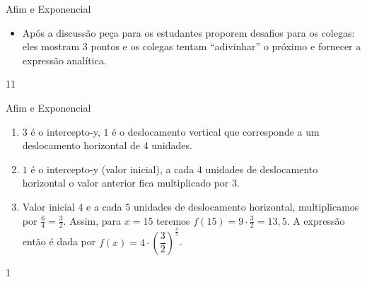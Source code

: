 \begin{sugestions}{Afim e Exponencial}
{
\begin{itemize}
\item Após a discussão peça para os estudantes proporem desafios para os colegas: eles mostram $3$ pontos e os colegas tentam “adivinhar” o próximo e fornecer a expressão analítica.

\end{itemize}
}{1}{1}
\end{sugestions}
\begin{answer}{Afim e Exponencial}
{
\begin{enumerate}

\item $3$ é o intercepto-y, $1$ é o deslocamento vertical que corresponde a um deslocamento horizontal de $4$ unidades.

\item
$1$ é o intercepto-y (valor inicial), a cada $4$ unidades de deslocamento horizontal o valor anterior fica multiplicado por $3$.

\item
Valor inicial $4$ e a cada $5$ unidades de deslocamento horizontal, multiplicamos por $\frac 64=\frac 32$. Assim, para $x=15$ teremos $f(15)=9\cdot \frac 32=13{,}5$.
A expressão então é dada por $f(x)=4\cdot \left(\dfrac 32\right)^{\frac x5}$.

\end{enumerate}
}{1}
\end{answer}


\vspace{-.5em}

